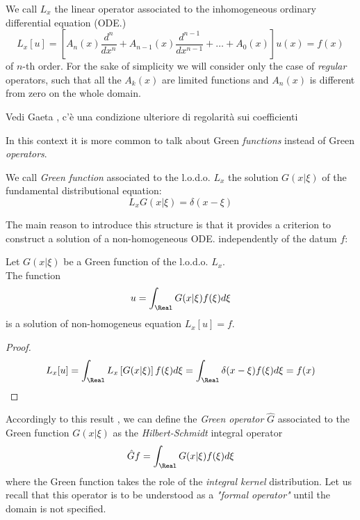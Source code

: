 \documentclass[Main]{subfiles}
\begin{document}
	We call $L_x$ the linear operator associated to the inhomogeneous ordinary differential equation (ODE.)
	\begin{displaymath}
		L_x [u] = \left[ A_n(x) \frac{d^n}{dx^n} + A_{n-1}(x) \frac{d^{n-1}}{dx^{n-1}} + \ldots + A_0(x) \right] u(x) = f(x)
	\end{displaymath}
	of $n$-th order.
	For the sake of simplicity we will consider only the case of \emph{regular} operators, such that all the $A_k(x)$ are limited functions and $A_n(x)$ is different from zero on the whole domain.
	\ifToninus \begin{Warning}
		Vedi Gaeta \cite{Gaeta2014}, c'è una condizione ulteriore di regolarità sui coefficienti
	\end{Warning} \fi
	
	In this context it is more common to talk about Green \textit{functions} instead of Green \textit{operators}.
	\begin{definition}
	We call \emph{Green function} associated to the l.o.d.o. $L_x$ the solution $G(x \vert \xi)$ of the fundamental distributional equation:
	\begin{equation}\label{Eq:FundamentalGreen}
		L_x G(x\vert\xi) = \delta(x-\xi)
	\end{equation}
	\end{definition}
	The main reason to introduce this structure is that it provides a criterion to construct a solution of a non-homogeneous ODE. independently of the datum $f$:
	\begin{proposition}
		Let $G(x \vert \xi)$ be a Green function of the l.o.d.o. $L_x$.\\
		The function
		\begin{displaymath}
			u = \int_\Real G( x \vert \xi) f(\xi) d\xi
		\end{displaymath}
		is a solution of non-homogeneus equation $L_x[u] = f$.
	\end{proposition}
	\begin{proof}
		\begin{displaymath}
			L_x[u] = \int_\Real L_x\left[ G(x \vert \xi ) \right] f(\xi) d\xi = \int_\Real \delta(x -\xi) f(\xi) d\xi = f(x)
		\end{displaymath}
	\end{proof}
	Accordingly to this result , we can define the \emph{Green operator} $\hat{G}$ associated to the Green function $G(x \vert \xi)$ as the \emph{Hilbert-Schmidt} integral operator 
			\begin{displaymath}
				\hat{G} f = \int_\Real G( x \vert \xi ) f(\xi) d\xi
			\end{displaymath}	
	where the Green function takes the role of the \emph{integral kernel} distribution.
	Let us recall that this operator is to be understood as a \emph{"formal operator"} until the domain is not specified.
	
\end{document}
